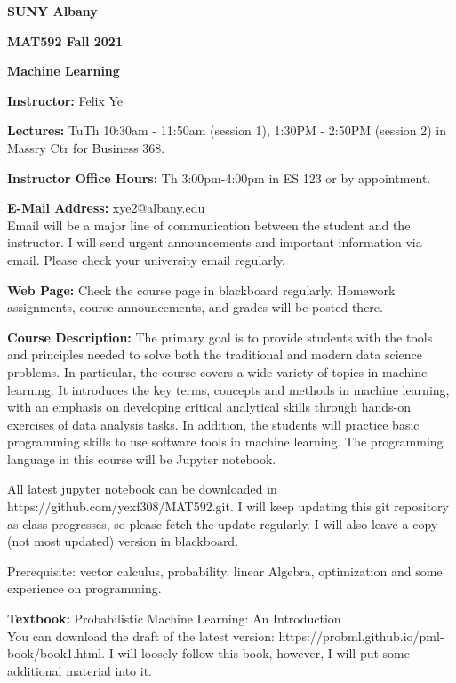 \documentclass[a4paper,10pt]{article}
\begin{document}
\begin{center}

\textbf{SUNY Albany}

\textbf{MAT592 Fall 2021}

\textbf{Machine Learning}


\end{center}

\textbf{Instructor:} Felix Ye 

\textbf{Lectures:} TuTh 10:30am - 11:50am (session 1), 1:30PM - 2:50PM (session 2) in Massry Ctr for Business 368.

\textbf{Instructor Office Hours:} Th 3:00pm-4:00pm in ES 123 or by appointment. 


\textbf{E-Mail Address:} xye2@albany.edu\\
Email will be a major line of communication between the student and the instructor. I will send urgent announcements and important information via email. Please check your university email regularly.

\textbf{Web Page:}
Check the course page in blackboard regularly. Homework assignments, course announcements, and grades will be posted there.


\textbf{Course Description:} The primary goal is to provide students with the tools and principles needed to solve both the traditional and modern data science problems. In particular, the course covers a wide variety of topics in machine learning. It introduces the key terms, concepts and methods in machine learning, with an emphasis on developing critical analytical skills through hands-on exercises of data analysis tasks. In addition, the students will practice basic programming skills to use software tools in machine learning. The programming language in this course will be Jupyter notebook. 

All latest jupyter notebook can be downloaded in https://github.com/yexf308/MAT592.git. I will keep updating this git repository as class progresses, so please fetch the update regularly. I will also leave a copy (not most updated) version in blackboard. 

 Prerequisite: vector calculus, probability, linear Algebra, optimization and some experience on programming. 
 

\textbf{Textbook:} Probabilistic Machine Learning: An Introduction \\
You can download the draft of the latest version: https://probml.github.io/pml-book/book1.html. 
 I will loosely follow this book, however, I will put some additional material into it.
\end{document}
